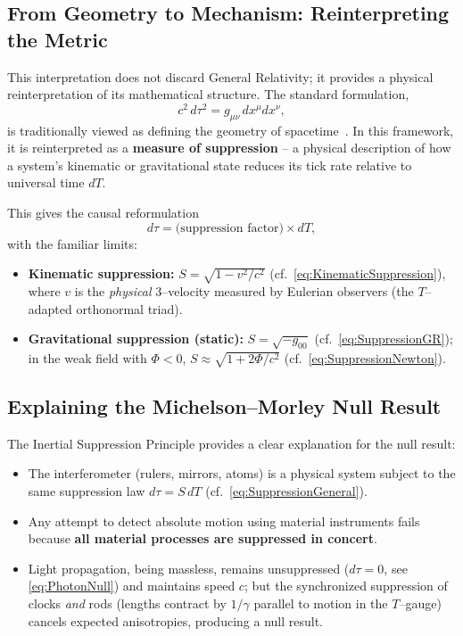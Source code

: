 \documentclass[12pt]{article}
\theoremstyle{plain} %
\begin{document}
\subsection*{From Geometry to Mechanism: Reinterpreting the Metric}

This interpretation does not discard General Relativity; it provides a physical reinterpretation of its mathematical structure. The standard formulation,
\begin{equation}
c^2 \, d\tau^2 = g_{\mu\nu} \, dx^\mu dx^\nu,
\label{eq:MetricStandard}
\end{equation}
is traditionally viewed as defining the geometry of spacetime~\cite{Minkowski1908}. In this framework, it is reinterpreted as a \textbf{measure of suppression} – a physical description of how a system's kinematic or gravitational state reduces its tick rate relative to universal time $dT$.

\medskip
\noindent
This gives the causal reformulation
\begin{equation}
d\tau = \text{(suppression factor)} \times dT,
\label{eq:CausalReformulation}
\end{equation}
with the familiar limits:
\begin{itemize}
    \item \textbf{Kinematic suppression:} $S=\sqrt{1 - v^2/c^2}$ (cf.~\eqref{eq:KinematicSuppression}), where $v$ is the \emph{physical} 3–velocity measured by Eulerian observers (the $T$–adapted orthonormal triad).
    \item \textbf{Gravitational suppression (static):} $S=\sqrt{-g_{00}}$ (cf.~\eqref{eq:SuppressionGR}); in the weak field with \(\Phi<0\), $S\approx\sqrt{1+2\Phi/c^2}$ (cf.~\eqref{eq:SuppressionNewton}).
\end{itemize}

\subsection*{Explaining the Michelson–Morley Null Result}

The Inertial Suppression Principle provides a clear explanation for the null result:

\begin{itemize}
    \item The interferometer (rulers, mirrors, atoms) is a physical system subject to the same suppression law $d\tau=S\,dT$ (cf.~\eqref{eq:SuppressionGeneral}).
    \item Any attempt to detect absolute motion using material instruments fails because \textbf{all material processes are suppressed in concert}.
    \item Light propagation, being massless, remains unsuppressed ($d\tau=0$, see \eqref{eq:PhotonNull}) and maintains speed $c$; but the synchronized suppression of clocks \emph{and} rods (lengths contract by $1/\gamma$ parallel to motion in the $T$–gauge) cancels expected anisotropies, producing a null result.
\end{itemize}
\end{document}
